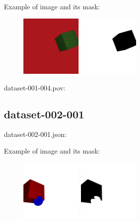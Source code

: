 Example of image and its mask:
\begin{center}
\begin{figure}[H]
\centering\includegraphics[width=3cm]{./img-001-004.png}
\centering\includegraphics[width=3cm]{./mask-001-004.png}
\end{figure}
\end{center}

dataset-001-004.pov:
\begin{scriptsize}
\begin{ttfamily}

\end{ttfamily}
\end{scriptsize}

\subsection{dataset-002-001}

dataset-002-001.json:
\begin{scriptsize}
\begin{ttfamily}

\end{ttfamily}
\end{scriptsize}

Example of image and its mask:
\begin{center}
\begin{figure}[H]
\centering\includegraphics[width=3cm]{./img-002-001.png}
\centering\includegraphics[width=3cm]{./mask-002-001.png}
\end{figure}
\end{center}

